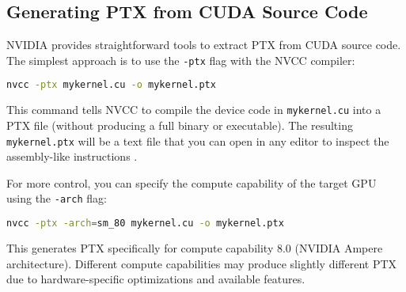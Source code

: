 \subsection{Generating PTX from CUDA Source Code}

NVIDIA provides straightforward tools to extract PTX from CUDA source code. The simplest approach is to use the \texttt{-ptx} flag with the NVCC compiler:

\begin{lstlisting}[language=bash]
nvcc -ptx mykernel.cu -o mykernel.ptx
\end{lstlisting}

This command tells NVCC to compile the device code in \texttt{mykernel.cu} into a PTX file (without producing a full binary or executable). The resulting \texttt{mykernel.ptx} will be a text file that you can open in any editor to inspect the assembly-like instructions \citep{nvidia_ptx_forums}.

For more control, you can specify the compute capability of the target GPU using the \texttt{-arch} flag:

\begin{lstlisting}[language=bash]
nvcc -ptx -arch=sm_80 mykernel.cu -o mykernel.ptx
\end{lstlisting}

This generates PTX specifically for compute capability 8.0 (NVIDIA Ampere architecture). Different compute capabilities may produce slightly different PTX due to hardware-specific optimizations and available features.

